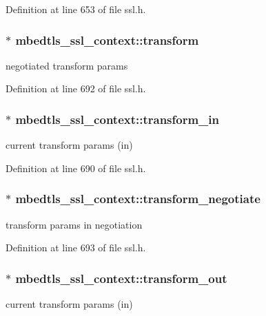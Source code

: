 Definition at line 653 of file ssl.\-h.

\hypertarget{structmbedtls__ssl__context_a501f615c5b6da6b21f666e913e96f343}{
\subsubsection[{transform}]{$\ast$ mbedtls\-\_\-ssl\-\_\-context\-::transform}}\label{structmbedtls__ssl__context_a501f615c5b6da6b21f666e913e96f343}
negotiated transform params 

Definition at line 692 of file ssl.\-h.

\hypertarget{structmbedtls__ssl__context_ac7ca7e3d2ee75a1d38f6dc8014c789d1}{
\subsubsection[{transform\-\_\-in}]{$\ast$ mbedtls\-\_\-ssl\-\_\-context\-::transform\-\_\-in}}\label{structmbedtls__ssl__context_ac7ca7e3d2ee75a1d38f6dc8014c789d1}
current transform params (in) 

Definition at line 690 of file ssl.\-h.

\hypertarget{structmbedtls__ssl__context_adce09e981f24eb615a5450194750deb7}{
\subsubsection[{transform\-\_\-negotiate}]{$\ast$ mbedtls\-\_\-ssl\-\_\-context\-::transform\-\_\-negotiate}}\label{structmbedtls__ssl__context_adce09e981f24eb615a5450194750deb7}
transform params in negotiation 

Definition at line 693 of file ssl.\-h.

\hypertarget{structmbedtls__ssl__context_a06e77983fa7ce4de0ffcd9ae8a038cdf}{
\subsubsection[{transform\-\_\-out}]{$\ast$ mbedtls\-\_\-ssl\-\_\-context\-::transform\-\_\-out}}\label{structmbedtls__ssl__context_a06e77983fa7ce4de0ffcd9ae8a038cdf}
current transform params (in) 

